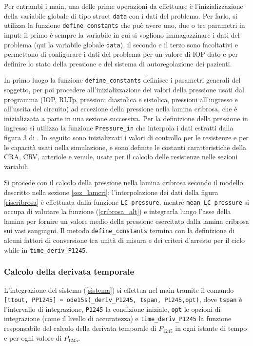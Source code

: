 \documentclass{article}
\begin{document}
Per entrambi i main, una delle prime operazioni da effettuare è l'inizializzazione della variabile globale di tipo struct \texttt{data} con i dati del problema.
Per farlo, si utilizza la funzione \texttt{define\_constants} che può avere uno, due o tre parametri in input: il primo è sempre la variabile in cui si vogliono immagazzinare i dati del problema (qui la variabile globale \texttt{data}), il secondo e il terzo sono facoltativi e permettono di configurare i dati del problema per un valore di IOP dato e per definire lo stato della pressione e del sistema di autoregolazione dei pazienti.

In primo luogo la funzione \texttt{define\_constants} definisce i parametri generali del soggetto, per poi procedere all'inizializzazione dei valori della pressione usati dal programma (IOP, RLTp, pressioni diastolica e sistolica, pressioni all'ingresso e all'uscita del circuito) ad eccezione della pressione nella lamina cribrosa, che è inizializzata a parte in una sezione successiva.
Per la definizione della pressione in ingresso si utilizza la funzione \texttt{Pressure\_in} che interpola i dati estratti dalla figura 3 di \cite{art1}.
In seguito sono inizializzati i valori di controllo per le resistenze e per le capacità usati nella simulazione, e sono definite le costanti caratteristiche della CRA, CRV, arteriole e venule, usate per il calcolo delle resistenze nelle sezioni variabili.

Si procede con il calcolo della pressione nella lamina cribrosa secondo il modello descritto nella sezione \ref{sez_lamcri}: l'interpolazione dei dati della figura \ref{riscribrosa} è effettuata dalla funzione \texttt{LC\_pressure}, mentre \texttt{mean\_LC\_pressure} si occupa di valutare la funzione (\ref{cribrosa_alt}) e integrarla lungo l'asse della lamina per fornire un valore medio della pressione esercitato dalla lamina cribrosa sui vasi sanguigni.
Il metodo \texttt{define\_constants} termina con la definizione di alcuni fattori di conversione tra unità di misura e dei criteri d'arresto per il ciclo while in \texttt{time\_deriv\_P1245}.

\subsubsection*{Calcolo della derivata temporale}
L'integrazione del sistema (\ref{sistema}) si effettua nel main tramite il comando \texttt{[ttout, PP1245] = ode15s(\@time\_deriv\_P1245, tspan, P1245,opt)}, dove \texttt{tspan} è l'intervallo di integrazione, \texttt{P1245} la condizione iniziale, \texttt{opt} le opzioni di integrazione (come il livello di accuratezza) e \texttt{time\_deriv\_P1245} la funzione responsabile del calcolo della derivata temporale di $P_{1245}$ in ogni istante di tempo e per ogni valore di $P_{1245}$.
\end{document}
